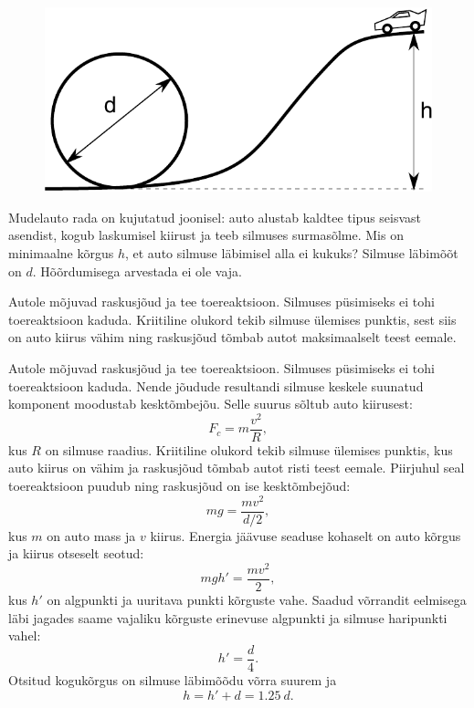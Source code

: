 
\begin{figure}%
\includegraphics[width=\linewidth]{2012-v2g-05-silmus}%
\end{figure}
Mudelauto rada on kujutatud joonisel: auto alustab kaldtee tipus seisvast
asendist, kogub laskumisel kiirust ja teeb silmuses surmasõlme. Mis on
minimaalne kõrgus $h$, et auto silmuse läbimisel alla ei kukuks? Silmuse
läbimõõt on $d$. Hõõrdumisega arvestada ei ole vaja.

\hint
Autole mõjuvad raskusjõud ja tee toereaktsioon. Silmuses püsimiseks ei tohi toereaktsioon kaduda. Kriitiline olukord tekib silmuse ülemises punktis, sest siis on auto kiirus vähim ning raskusjõud tõmbab autot maksimaalselt teest eemale.

\solu
Autole mõjuvad raskusjõud ja tee toereaktsioon. Silmuses püsimiseks ei tohi
toereaktsioon kaduda. Nende jõudude resultandi silmuse keskele
suunatud komponent moodustab kesktõmbejõu. Selle suurus sõltub auto kiirusest:
\[F_c=m\frac{v^2}{R},\]
kus $R$ on silmuse raadius.
Kriitiline olukord tekib silmuse ülemises punktis, kus auto kiirus on vähim ja
raskusjõud tõmbab autot risti teest eemale. Piirjuhul seal
toereaktsioon puudub ning raskusjõud on ise kesktõmbejõud:
\[ mg=\frac{mv^2}{d/2},\]
kus $m$ on auto mass ja $v$ kiirus.
Energia jäävuse seaduse kohaselt on auto kõrgus ja kiirus otseselt seotud:
\[ mgh'=\frac{mv^2}{2},\]
kus $h'$ on algpunkti ja uuritava punkti kõrguste vahe. Saadud võrrandit 
eelmisega läbi jagades saame vajaliku kõrguste erinevuse algpunkti ja silmuse 
haripunkti vahel:
\[ h'=\frac{d}{4}.\]
Otsitud kogukõrgus on silmuse läbimõõdu võrra suurem ja
\[ h=h'+d=\SI{1,25}{d}.\]

